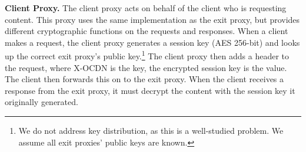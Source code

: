 {\bf Client Proxy.} The client proxy acts on behalf of the client who is requesting 
content.  This proxy uses the same implementation as the exit proxy, but provides 
different cryptographic functions on the requests and responses.  When a client makes 
a request, the client proxy generates a session key  (AES 256-bit) and looks up the correct exit proxy's 
public key.\footnote{We do not address key distribution, as this is a well-studied problem.  We 
assume all exit proxies' public keys are known.}  The client proxy then adds a header to the request, 
where X-OCDN is the key, the encrypted session key is the value.  The client then forwards this on to the 
exit proxy.  When the client receives a response from the exit proxy, it must decrypt the content 
with the session key it originally generated.   
